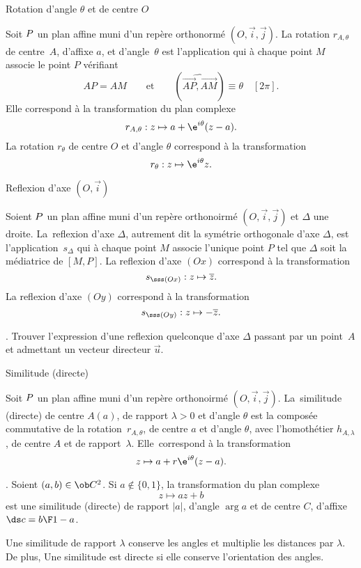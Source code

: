 \Concept [] Rotation d'angle $\theta$ et de centre $O$

\noindent
Soit $\sc P$ un plan affine muni d'un repère orthonormé $(O,\vec i,\vec j)$. 
La rotation $r_{A,\theta}$ de centre~$A$, d'affixe $a$, et d'angle~$\theta$ est l'application qui à chaque point $M$ associe le point $P$ vérifiant 
$$
AP=AM\qquad\mbox{et}\qquad (\widehat{\vec{AP},\vec{AM}})\equiv\theta\quad[2\pi].
$$
Elle correspond à la transformation du plan complexe 
$$
r_{A,\theta}:z\mapsto a+\e^{i\theta}(z-a). 
$$ 
La rotation $r_\theta$ de centre $O$ et d'angle $\theta$ correspond à la transformation 
$$
{r_\theta:z\mapsto\e^{i\theta}z}.
$$

\Concept [] Reflexion d'axe $(O,\vec i)$

\noindent
Soient $\sc P$ un plan affine muni d'un repère orthonoirmé $(O,\vec i,\vec j)$ et $\Delta$ une droite. 
La~reflexion d'axe $\Delta$, autrement dit la symétrie orthogonale d'axe $\Delta$, est l'application~$s_\Delta$ qui à chaque point $M$ associe l'unique point $P$ tel que $\Delta$ soit la médiatrice de $[M,P]$. 
\bigskip
\noindent
La reflexion d'axe $(Ox)$ correspond à la transformation 
$$
{
s_{\sss(Ox)}:z\mapsto \overline z}. 
$$ 
La reflexion d'axe $(Oy)$ correspond à la transformation 
$$
{
s_{\sss(Oy)}:z\mapsto -\overline z}.
$$

\Exercice. Trouver l'expression d'une reflexion quelconque d'axe $\Delta$ passant par un point~$A$ et admettant un vecteur directeur $\vec u$. 
\bigskip

\Concept [] Similitude (directe)

\noindent
Soit $\sc P$ un plan affine muni d'un repère orthonoirmé $(O,\vec i,\vec j)$. La~similitude (directe) de centre $A(a)$, de rapport $\lambda>0$ et d'angle $\theta$ est la composée commutative de la rotation~$r_{A,\theta}$, 
de centre $a$ et d'angle $\theta$, avec l'homothétier $h_{A,\lambda}$, de centre $A$ et de rapport~$\lambda$. 
Elle~correspond à la transformation 
$$
{z\mapsto a+r\e^{i\theta}(z-a)}. 
$$

\Remarque. Soient $(a,b)\in\ob C^2$. Si $a\notin\{0,1\}$, la transformation du plan complexe 
$$
z\mapsto az+b
$$
est une similitude (directe) de rapport $|a|$, d'angle $\arg a$ et de centre $C$, d'affixe $\ds c={b\F 1-a}$. 
\bigskip

\noindent
Une similitude de rapport $\lambda$ conserve les angles et multiplie les distances par $\lambda$. De plus, Une similitude est directe si elle conserve l'orientation des angles. 


